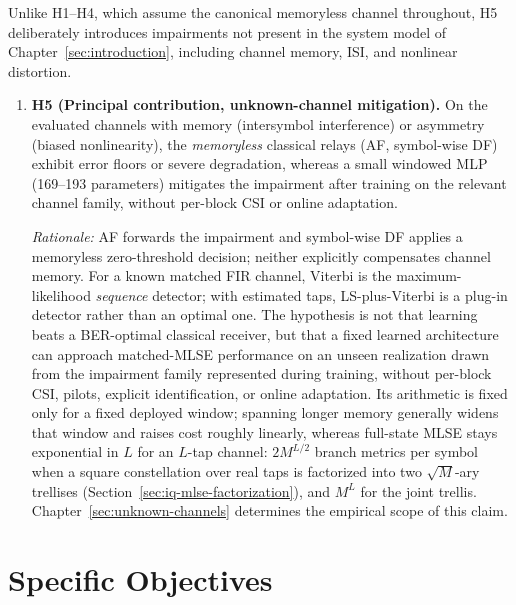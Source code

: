 Unlike H1--H4, which assume the canonical memoryless channel throughout, H5 deliberately introduces impairments not present in the system model of Chapter~\ref{sec:introduction}, including channel memory, ISI, and nonlinear distortion.
\begin{enumerate}[start=5]
\item \textbf{H5 (Principal contribution, unknown-channel mitigation).} On the evaluated channels with memory (intersymbol interference) or asymmetry (biased nonlinearity), the \emph{memoryless} classical relays (AF, symbol-wise DF) exhibit error floors or severe degradation, whereas a small windowed MLP (169--193 parameters) mitigates the impairment after training on the relevant channel family, without per-block CSI or online adaptation.

\emph{Rationale:} AF forwards the impairment and symbol-wise DF applies a memoryless zero-threshold decision; neither explicitly compensates channel memory. For a known matched FIR channel, Viterbi is the maximum-likelihood \emph{sequence} detector; with estimated taps, LS-plus-Viterbi is a plug-in detector rather than an optimal one. The hypothesis is not that learning beats a BER-optimal classical receiver, but that a fixed learned architecture can approach matched-MLSE performance on an unseen realization drawn from the impairment family represented during training, without per-block CSI, pilots, explicit identification, or online adaptation. Its arithmetic is fixed only for a fixed deployed window; spanning longer memory generally widens that window and raises cost roughly linearly, whereas full-state MLSE stays exponential in $L$ for an $L$-tap channel: $2M^{L/2}$ branch metrics per symbol when a square constellation over real taps is factorized into two $\sqrt{M}$-ary trellises (Section~\ref{sec:iq-mlse-factorization}), and $M^L$ for the joint trellis. Chapter~\ref{sec:unknown-channels} determines the empirical scope of this claim.
\end{enumerate}

\section{Specific Objectives}\label{sec:specific-objectives}

